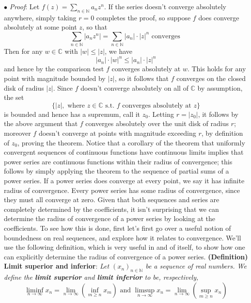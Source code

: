 \documentclass{article}
\newcommand*{\tb}{\textbf}
\newcommand*{\ti}{\textit}
\newcommand*{\n}{\newline}
\newcommand*{\nn}{\newline \newline}
\newcommand*{\Pf}{\indent \ensuremath{\bullet} \textit{Proof}: }
\newcommand*{\N}{\mathbb{N}}
\newcommand*{\C}{\mathbb{C}}
\newcommand*{\st}{\text{ s.t. }}
\begin{document}
\n
\Pf Let $ f(z) = \sum_{n \in \N} a_n z^n $. If the series doesn't converge absolutely anywhere, simply taking $ r = 0 $ completes the proof, so suppose $ f $ does converge absolutely at some point $ z $, so that
    $$ \sum_{n \in \N} | a_n z^n | = \sum_{n \in \N} | a_n | \cdot | z |^n \text{ converges } $$
Then for any $ w \in \C $ with $ | w | \leq | z | $, we have
    $$ | a_n | \cdot | w |^n \leq | a_n | \cdot | z |^n $$
and hence by the comparison test $ f $ converges absolutely at $ w $. This holds for any point with magnitude bounded by $ | z | $, so it follows that $ f $ converges on the closed disk of radius $ | z | $. Since $ f $ doesn't converge absolutely on all of $ \C $ by assumption, the set
    $$ \{ | z |, \text{ where } z \in \C \st f \text{ converges absolutely at } z \} $$
is bounded and hence has a supremum, call it $ z_0 $. Letting $ r = | z_0 | $, it follows by the above argument that $ f $ converges absolutely over the unit disk of radius $ r $; moreover $ f $ doesn't converge at points with magnitude exceeding $ r $, by definition of $ z_0 $, proving the theorem. \qedsymbol
\nn
Notice that a corollary of the theorem that uniformly convergent sequences of continuous functions have continuous limits implies that power series are continuous functions within their radius of convergence; this follows by simply applying the theorem to the sequence of partial sums of a power series. If a power series does converge at every point, we say it has infinite radius of convergence. Every power series has some radius of convergence, since they must all converge at zero. Given that both sequences and series are completely determined by the coefficients, it isn't surprising that we can determine the radius of convergence of a power series by looking at the coefficients. To see how this is done, first let's first go over a useful notion of boundedness on real sequences, and explore how it relates to convergence. We'll use the following definition, which is very useful in and of itself, to show how one can explicitly determine the radius of convergence of a power series.
\nn
\tb{(Definition) Limit superior and inferior}: \ti{Let $ ( x_n )_{n \in \N} $ be a sequence of real numbers. We define the \tb{limit superior} and \tb{limit inferior} to be, respectively,}
    $$ \liminf_{n \to \infty} x_n = \lim_{n \to \infty} \left( \inf_{m \geq n} x_m \right) \text{ and } \limsup_{n \to \infty} x_n = \lim_{n \to \infty} \left( \sup_{m \geq n} x_n \right) $$
\n
\end{document}
